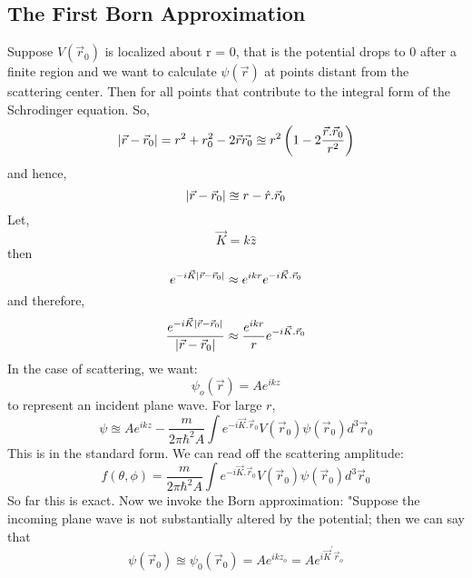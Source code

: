 \subsection{The First Born Approximation}
Suppose $V(\vec{r}_{0})$ is localized about r = 0, that is the potential drops to 0 after a finite region and we want to calculate $\psi(\vec{r})$ at points distant from the scattering center. Then for all points that contribute to the integral form of the Schrodinger equation. So,
\begin{equation}
\abs{\vec{r} - \vec{r}_{0}} = r^{2} + r_{0}^{2} - 2\vec{r}\vec{r_{0}}  \approxeq r^{2} \left(1 - 2\frac{\vec{r}.\vec{r}_{0}}{r^{2}} \right)
\end{equation}
and hence,
\begin{equation}
\abs{\vec{r} - \vec{r}_{0}} \approxeq r - \hat{r} . \vec{r}_{0}
\end{equation}
Let,
\begin{equation}
\vec{K} = k \hat{z}
\end{equation}
then
\begin{equation}
e^{-i \vec{K}\abs{\vec{r} - \vec{r}_{0}}} \approx e^{ikr}e^{-i \vec{K}.\vec{r}_{0}}
\end{equation}
and therefore,
\begin{equation}
\frac{e^{-i \vec{K}\abs{\vec{r} - \vec{r}_{0}}}}{\abs{\vec{r} - \vec{r}_{0}}} \approx \frac{e^{ikr}}{r}e^{-i \vec{K}.\vec{r}_{0}}
\end{equation}
In the case of scattering, we want:
\begin{equation}
\psi_{o}(\vec{r}) = Ae^{ikz}
\end{equation} 
to represent an incident plane wave. For large $r$,
\begin{equation}
\psi \approxeq Ae^{ikz} - \frac{m}{2 \pi \hbar^{2}A} \int e^{-i \vec{K}.\vec{r}_{0}}V(\vec{r}_{0})\psi(\vec{r}_{0})d^{3}\vec{r}_{0}
\end{equation}
This is in the standard form. We can read off the scattering amplitude:
\begin{equation}
f(\theta, \phi) = \frac{m}{2 \pi \hbar^{2}A} \int e^{-i \vec{K}.\vec{r}_{0}}V(\vec{r}_{0})\psi(\vec{r}_{0})d^{3}\vec{r}_{0}
\end{equation}
So far this is exact. Now we invoke the Born approximation: "Suppose the incoming plane wave is not substantially altered by the potential; then we can say that
\begin{equation}
\psi(\vec{r}_{0}) \approxeq \psi_{0}(\vec{r}_{0}) = A e^{ikz_{o}} = A e^{i\vec{K}^{'}\vec{r}_{o}}
\end{equation}
